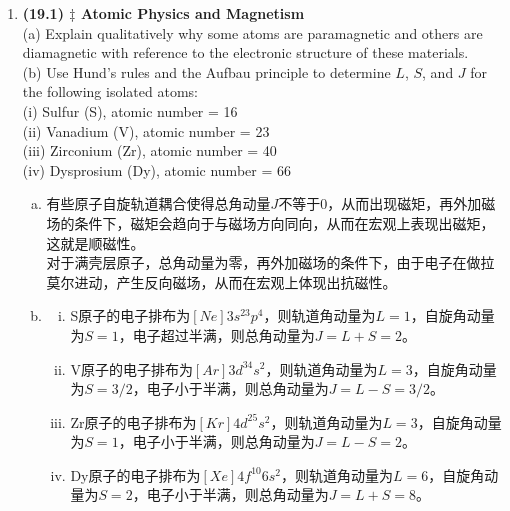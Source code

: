 \documentclass[reqno,a4paper,12pt]{amsart}
\begin{document}
\begin{enumerate}[1.]
\item \textbf{(19.1) $\ddagger$ Atomic Physics and Magnetism} \\
(a) Explain qualitatively why some atoms are paramagnetic and others are diamagnetic with reference to the electronic structure of these materials. \\
(b) Use Hund's rules and the Aufbau principle to determine $L$, $S$, and $J$ for the following isolated atoms: \\ 
\text{} \hspace{1em} (i) Sulfur (S), atomic number = 16 \\
\text{} \hspace{1em} (ii) Vanadium (V), atomic number = 23 \\
\text{} \hspace{1em} (iii) Zirconium (Zr), atomic number = 40 \\
\text{} \hspace{1em} (iv) Dysprosium (Dy), atomic number = 66
\begin{tcolorbox}[breakable, colback = black!5!white, colframe = black]
\begin{enumerate}[(a)]
\item 有些原子自旋轨道耦合使得总角动量$J$不等于0，从而出现磁矩，再外加磁场的条件下，磁矩会趋向于与磁场方向同向，从而在宏观上表现出磁矩，这就是顺磁性。 \\
对于满壳层原子，总角动量为零，再外加磁场的条件下，由于电子在做拉莫尔进动，产生反向磁场，从而在宏观上体现出抗磁性。

\item 
\begin{enumerate}[(i)]
	\item S原子的电子排布为$[Ne]3s^23p^4$，则轨道角动量为$L=1$，自旋角动量为$S=1$，电子超过半满，则总角动量为$J=L+S=2$。
	
	\item V原子的电子排布为$[Ar]3d^34s^2$，则轨道角动量为$L=3$，自旋角动量为$S=3/2$，电子小于半满，则总角动量为$J=L-S=3/2$。
	
	\item Zr原子的电子排布为$[Kr]4d^25s^2$，则轨道角动量为$L=3$，自旋角动量为$S=1$，电子小于半满，则总角动量为$J=L-S=2$。
	
	\item Dy原子的电子排布为$[Xe]4f^{10}6s^2$，则轨道角动量为$L=6$，自旋角动量为$S=2$，电子小于半满，则总角动量为$J=L+S=8$。
\end{enumerate}

\end{enumerate}
\end{tcolorbox}


\end{enumerate}
\end{document}
